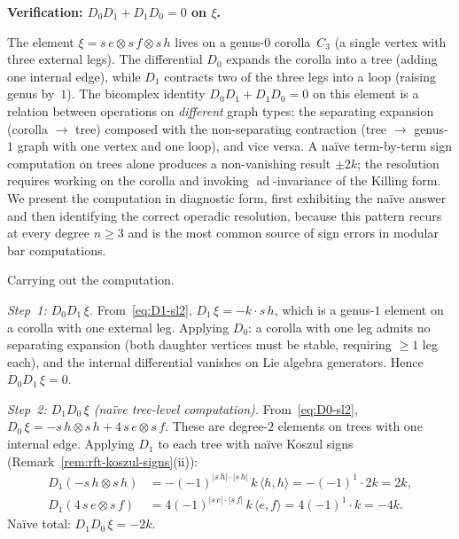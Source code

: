 \begin{example}
\medskip\noindent
\textbf{Verification: $D_0 D_1 + D_1 D_0 = 0$ on $\xi$.}

\begin{remark}
\label{rem:sl2-bicomplex-scope}
The element $\xi = s\,e \otimes s\,f \otimes s\,h$ lives on
a genus-$0$ corolla~$C_3$ (a single vertex with three
external legs). The differential $D_0$ expands the
corolla into a tree (adding one internal edge), while $D_1$
contracts two of the three legs into a loop (raising genus
by~$1$). The bicomplex identity $D_0 D_1 + D_1 D_0 = 0$
on this element is a relation between operations on
\emph{different} graph types: the separating expansion
(corolla $\to$ tree) composed with the non-separating
contraction (tree $\to$ genus-$1$ graph with one vertex and
one loop), and vice versa. A na\"ive term-by-term sign
computation on trees alone produces a non-vanishing result
$\pm 2k$; the resolution requires working on the corolla and
invoking $\operatorname{ad}$-invariance of the Killing form.
We present the computation in diagnostic form, first exhibiting
the na\"ive answer and then identifying the correct operadic
resolution, because this pattern recurs at every degree
$n \geq 3$ and is the most common source of sign errors in
modular bar computations.
\end{remark}

\noindent Carrying out the computation.

\smallskip\noindent
\emph{Step~1: $D_0 D_1\,\xi$.}
From~\eqref{eq:D1-sl2}, $D_1\,\xi = -k \cdot s\,h$, which
is a genus-$1$ element on a corolla with one external leg.
Applying $D_0$: a corolla with one leg admits no separating
expansion (both daughter vertices must be stable, requiring
$\ge 1$ leg each), and the internal differential vanishes
on Lie algebra generators. Hence
$D_0 D_1\,\xi = 0$.

\smallskip\noindent
\emph{Step~2: $D_1 D_0\,\xi$ (na\"ive tree-level
computation).}
From~\eqref{eq:D0-sl2}, $D_0\,\xi = -s\,h \otimes s\,h
+ 4\, s\,e \otimes s\,f$. These are degree-$2$ elements
on trees with one internal edge. Applying $D_1$ to each
tree with na\"ive Koszul signs
(Remark~\ref{rem:rft-koszul-signs}(ii)):
\begin{align*}
D_1(-s\,h \otimes s\,h)
&= -(-1)^{|s\,h| \cdot |s\,h|}\,k\,\langle h,h\rangle
= -(-1)^{1}\cdot 2k = 2k, \\
D_1(4\, s\,e \otimes s\,f)
&= 4(-1)^{|s\,e| \cdot |s\,f|}\,k\,\langle e,f\rangle
= 4(-1)^{1}\cdot k = -4k.
\end{align*}
Na\"ive total: $D_1 D_0\,\xi = -2k$.


\end{example}
